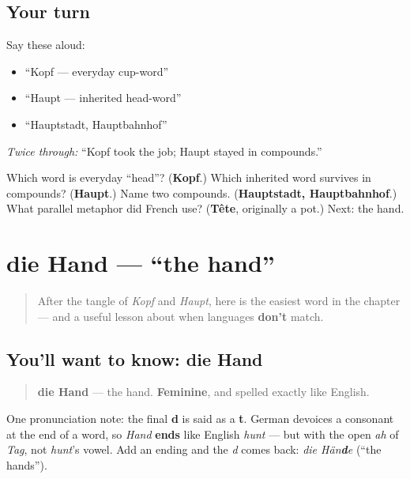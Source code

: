 \subsection*{Your turn}
Say these aloud:

\begin{itemize}
\raggedright
  \item “Kopf — everyday cup-word”
  \item “Haupt — inherited head-word”
  \item “Hauptstadt, Hauptbahnhof”
\end{itemize}

\emph{Twice through:} “Kopf took the job; Haupt stayed in compounds.”

\begin{tcolorbox}[breakable,colback=teal!4,colframe=teal!35!black,title={Before you move on}]
Which word is everyday “head”? (\textbf{Kopf}.) Which inherited word survives in compounds? (\textbf{Haupt}.) Name two compounds. (\textbf{Hauptstadt, Hauptbahnhof}.) What parallel metaphor did French use? (\textbf{Tête}, originally a pot.) Next: the hand.
\end{tcolorbox}
\section[die Hand]{die Hand — \textquotedblleft{}the hand\textquotedblright{}}

\label{lesson:GE-C17-hand}



\begin{quote}
After the tangle of \emph{Kopf} and \emph{Haupt}, here is the easiest word in the chapter — and a useful lesson about when languages \textbf{don't} match.
\end{quote}

\subsection*{You'll want to know: die Hand}
\begin{quote}
\textbf{die Hand} — the hand. \textbf{Feminine}, and spelled exactly like English.
\end{quote}

\begin{sounds}
One pronunciation note: the final \textbf{d} is said as a \textbf{t}. German devoices a consonant at the end of a word, so \emph{Hand} \textbf{ends} like English \emph{hunt} — but with the open \emph{ah} of \emph{Tag}, not \emph{hunt}'s vowel. Add an ending and the \emph{d} comes back: \emph{die Hän\textbf{d}e} (\textquotedblleft{}the hands\textquotedblright{}).
\end{sounds}

